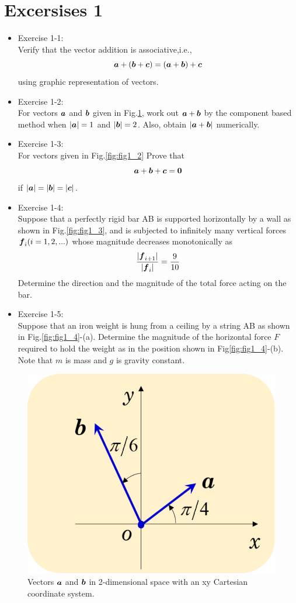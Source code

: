 \section*{Excersises 1}
\begin{itemize}
\item
Exercise 1-1:\\
Verify that the vector addition is associative,i.e., 
\[
	\mbox{\boldmath $a$}+(\mbox{\boldmath $b$}+\mbox{\boldmath $c$})=
		(\mbox{\boldmath $a$}+\mbox{\boldmath $b$})+\mbox{\boldmath $c$}
\]
using graphic representation of vectors. 
\item
Exercise 1-2:\\
For vectors $\mbox{\boldmath $a$}$ and $\mbox{\boldmath $b$}$ given in Fig.\ref{fig:fig1_1}, 
work out $\mbox{\boldmath $a$}+\mbox{\boldmath $b$}$ by the component based 
		method when  $|\mbox{\boldmath $a$}|=1$ and $|\mbox{\boldmath $b$}|=2$.
		Also, obtain $|\mbox{\boldmath $a$}+\mbox{\boldmath $b$}|$ numerically.
\item
Exercise 1-3:\\
		For vectors given in Fig.\ref{fig:fig1_2} Prove that 
	\[
		\mbox{\boldmath $a$}+\mbox{\boldmath $b$}+\mbox{\boldmath $c$}=\mbox{\boldmath $0$}
	\]
		if $|\mbox{\boldmath $a$}|=|\mbox{\boldmath $b$}|=|\mbox{\boldmath $c$}|$.
\item
Exercise 1-4:\\
Suppose that a perfectly rigid bar AB is supported horizontally by a wall
 as shown in Fig.\ref{fig:fig1_3}, and is subjected to infinitely many 
vertical forces $\mbox{\boldmath $f$}_i (i=1,2,...)$ whose magnitude decreases monotonically as 
\[
 \frac{
	|\mbox{\boldmath $f$}_{i+1}|
	}{
	|\mbox{\boldmath $f$}_i|
}
	=\frac{9}{10} 
\]
Determine the direction and the magnitude of the total force acting on the bar. 
\item
Exercise 1-5:\\
	Suppose that an iron weight is hung from a ceiling by a string AB as shown in Fig.\ref{fig:fig1_4}-(a). 
	Determine the magnitude of the horizontal force $F$ required to hold the weight as 
	in the position shown in Fig\ref{fig:fig1_4}-(b).
	Note that $m$ is mass and $g$ is gravity constant.  
\end{itemize}
\begin{figure}[h]
	\begin{center}
	\includegraphics[width=0.4\linewidth]{Prb1/fig1_1.eps} 
	\end{center}
	\caption{Vectors $\mbox{\boldmath $a$}$ and $\mbox{\boldmath $b$}$ in 2-dimensional space with an
	xy Cartesian coordinate system.}
	\label{fig:fig1_1}
\end{figure}
